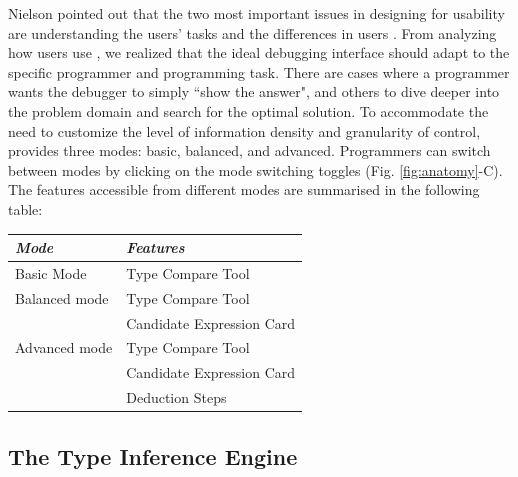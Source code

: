Nielson pointed out  that the two most important issues in designing for usability are understanding the users' tasks and the differences in users \cite{jakob_nielsen_usability_1993}. From analyzing how users use \chameleon{}, we realized that the ideal debugging interface should adapt to the specific programmer and programming task. There are cases where a programmer wants the debugger to simply ``show the answer", and others to dive deeper into the problem domain and search for the optimal solution. To accommodate the need to customize the level of information density and granularity of control, \chameleon{} provides three modes: basic, balanced, and advanced. Programmers can switch between modes by clicking on the mode switching toggles (Fig. \ref{fig:anatomy}-C). The features accessible from different modes are summarised in the following table:%

\begin{scriptsize}
\begin{center}
    \begin{tabular}{ l l  }
     \textit{Mode} & \textit{Features} \\ \hline
     Basic Mode & Type Compare Tool \\ \hline
     Balanced mode & Type Compare Tool \\
     & Candidate Expression Card \\  \hline
     Advanced mode & Type Compare Tool \\
     & Candidate Expression Card \\
     & Deduction Steps \\
    \end{tabular}
    \end{center}
\end{scriptsize}


\subsection{The Type Inference Engine}
\label{sec:typeinferenceengine}

